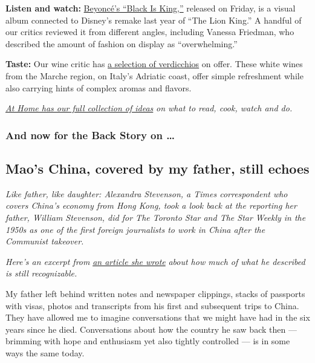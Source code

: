 \textbf{Listen and watch:}
\href{https://www.nytimes.com/2020/07/31/arts/music/beyonce-black-is-king.html}{Beyoncé's
``Black Is King,''} released on Friday, is a visual album connected to
Disney's remake last year of ``The Lion King.'' A handful of our critics
reviewed it from different angles, including Vanessa Friedman, who
described the amount of fashion on display as ``overwhelming.''

\textbf{Taste:} Our wine critic has
\href{https://www.nytimes.com/2020/07/30/dining/drinks/wine-school-verdicchio-di-matelica.html?action=click\&module=RelatedLinks\&pgtype=collection}{a
selection of verdicchios} on offer. These white wines from the Marche
region, on Italy's Adriatic coast, offer simple refreshment while also
carrying hints of complex aromas and flavors.

\href{https://www.nytimes.com/spotlight/at-home}{\emph{At Home has our
full collection of ideas}} \emph{on what to read, cook, watch and do.}

\hypertarget{and-now-for-the-back-story-on-}{%
\subsubsection{And now for the Back Story on
\ldots{}}\label{and-now-for-the-back-story-on-}}

\hypertarget{maos-china-covered-by-my-father-still-echoes}{%
\subsection{Mao's China, covered by my father, still
echoes}\label{maos-china-covered-by-my-father-still-echoes}}

\emph{Like father, like daughter: Alexandra Stevenson, a Times
correspondent who covers China's economy from Hong Kong, took a look
back at the reporting her father, William Stevenson, did for The Toronto
Star and The Star Weekly in the 1950s as one of the first foreign
journalists to work in China after the Communist takeover.}

\emph{Here's an excerpt from}
\href{https://www.nytimes.com/interactive/2020/07/30/world/asia/china-1950s-echoed-today.html}{\emph{an
article she wrote}} \emph{about how much of what he described is still
recognizable.}

My father left behind written notes and newspaper clippings, stacks of
passports with visas, photos and transcripts from his first and
subsequent trips to China. They have allowed me to imagine conversations
that we might have had in the six years since he died. Conversations
about how the country he saw back then --- brimming with hope and
enthusiasm yet also tightly controlled --- is in some ways the same
today.

